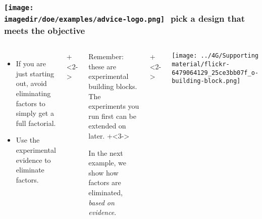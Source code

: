 \begin{frame}\frametitle{\texttt{[image: \\imagedir/doe/examples/advice-logo.png]}\,\, pick a design that meets the objective}
	
	\begin{columns}[T]
		
			\begin{itemize}
				\item	If you are just starting out, avoid eliminating factors to simply get a full factorial.
				\item	Use the experimental evidence to eliminate factors.
			\end{itemize}
			
			
			\vspace{1cm}
			\onslide+<2->{
				\begin{itemize}
					\item	Remember: these are experimental building blocks. The experiments you run first can be extended on later.
					\vspace{0.5cm}
					\onslide+<3->{
						\item	In the next example, we show how factors are eliminated, {\color{myOrange}\emph{based on evidence}}.
					}
				\end{itemize}
			}
	
			\vspace{1cm}
			
			\onslide+<2->{
				\centerline{\texttt{[image: ../4G/Supporting material/flickr-6479064129\_25ce3bb07f\_o-building-block.png]}}
		
			}
	\end{columns}
\end{frame}
